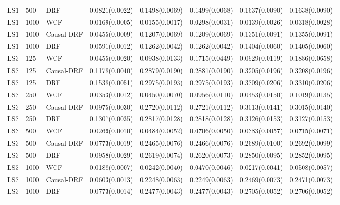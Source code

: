 \begin{longtable}{lllrrrrr}
LS1 & 500 & DRF & 0.0821(0.0022) & 0.1498(0.0069) & 0.1499(0.0068) & 0.1637(0.0090) & 0.1638(0.0090) \\
\addlinespace
LS1 & 1000 & WCF & 0.0169(0.0005) & 0.0155(0.0017) & 0.0298(0.0031) & 0.0139(0.0026) & 0.0318(0.0028) \\
LS1 & 1000 & Causal-DRF & 0.0455(0.0009) & 0.1207(0.0069) & 0.1209(0.0069) & 0.1351(0.0091) & 0.1355(0.0091) \\
LS1 & 1000 & DRF & 0.0591(0.0012) & 0.1262(0.0042) & 0.1262(0.0042) & 0.1404(0.0060) & 0.1405(0.0060) \\
\addlinespace
\midrule
LS3 & 125 & WCF & 0.0455(0.0020) & 0.0938(0.0133) & 0.1715(0.0449) & 0.0929(0.0119) & 0.1886(0.0658) \\
LS3 & 125 & Causal-DRF & 0.1178(0.0040) & 0.2879(0.0190) & 0.2881(0.0190) & 0.3205(0.0196) & 0.3208(0.0196) \\
LS3 & 125 & DRF & 0.1538(0.0051) & 0.2975(0.0193) & 0.2975(0.0193) & 0.3309(0.0206) & 0.3310(0.0206) \\
\addlinespace
LS3 & 250 & WCF & 0.0353(0.0012) & 0.0450(0.0070) & 0.0956(0.0110) & 0.0453(0.0150) & 0.1019(0.0135) \\
LS3 & 250 & Causal-DRF & 0.0975(0.0030) & 0.2720(0.0112) & 0.2721(0.0112) & 0.3013(0.0141) & 0.3015(0.0140) \\
LS3 & 250 & DRF & 0.1307(0.0035) & 0.2817(0.0128) & 0.2818(0.0128) & 0.3126(0.0153) & 0.3127(0.0153) \\
\addlinespace
LS3 & 500 & WCF & 0.0269(0.0010) & 0.0484(0.0052) & 0.0706(0.0050) & 0.0383(0.0057) & 0.0715(0.0071) \\
LS3 & 500 & Causal-DRF & 0.0773(0.0019) & 0.2465(0.0076) & 0.2466(0.0076) & 0.2689(0.0100) & 0.2692(0.0099) \\
LS3 & 500 & DRF & 0.0958(0.0029) & 0.2619(0.0074) & 0.2620(0.0073) & 0.2850(0.0095) & 0.2852(0.0095) \\
\addlinespace
LS3 & 1000 & WCF & 0.0188(0.0007) & 0.0242(0.0040) & 0.0470(0.0046) & 0.0217(0.0041) & 0.0508(0.0057) \\
LS3 & 1000 & Causal-DRF & 0.0603(0.0013) & 0.2248(0.0063) & 0.2249(0.0063) & 0.2469(0.0073) & 0.2471(0.0073) \\
LS3 & 1000 & DRF & 0.0773(0.0014) & 0.2477(0.0043) & 0.2477(0.0043) & 0.2705(0.0052) & 0.2706(0.0052) \\
\addlinespace
\midrule
\bottomrule
\end{longtable}
\endgroup
